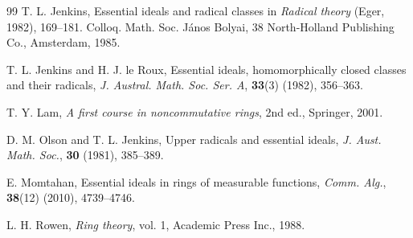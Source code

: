 \documentclass[11pt,leqno]{amsart}
\theoremstyle{definition}
\theoremstyle{remark}
\numberwithin{equation}{section}
\numberwithin{equation}{section}
\begin{document}
\begin{thebibliography}{99}
T. L. Jenkins, Essential ideals and radical classes in \textit{Radical theory} (Eger, 1982), 169--181.
Colloq. Math. Soc. János Bolyai, 38
North-Holland Publishing Co., Amsterdam, 1985.

T. L. Jenkins and H. J. le Roux, 
Essential ideals, homomorphically closed classes and their radicals,
\textit{J. Austral. Math. Soc. Ser. A}, \textbf{33}(3) (1982),  356--363.

 T. Y. Lam, \textit{A first course in noncommutative rings}, 2nd ed., Springer, 2001.
 
 D. M. Olson and T. L. Jenkins, Upper radicals and essential ideals, \textit{J. Aust. Math. Soc.}, \textbf{30} (1981), 385--389. 

 E. Momtahan, Essential ideals in rings of measurable functions, \textit{Comm. Alg.}, \textbf{38}(12) (2010), 4739--4746.

  L. H. Rowen, \textit{Ring theory}, vol. 1, Academic Press Inc., 1988.
\end{thebibliography}
\end{document}
